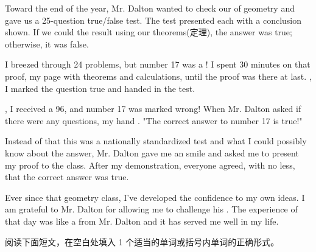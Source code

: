 \documentclass{英语试卷}
\begin{document}
\par Toward the end of the year, Mr. Dalton wanted to check our  of geometry and gave us a 25-question true/false test. The test presented each  with a conclusion shown. If we could  the result using our theorems(定理), the answer was true; otherwise, it was false.\par
\par I breezed through 24 problems, but number 17 was a ! I spent 30 minutes on that proof,  my page with theorems and calculations, until the proof was there at last. , I marked the question true and handed in the test.\par
\par {}, I received a 96, and number 17 was marked wrong! When Mr. Dalton asked if there were any questions, my hand . "The correct answer to number 17 is true!"\par
\par Instead of  that this was a nationally standardized test and what I could possibly know about the answer, Mr. Dalton gave me an  smile and asked me to present my proof to the class. After my demonstration, everyone agreed, with  no less, that the correct answer was true.\par
\par Ever since that geometry class, I've developed the confidence to  my own ideas. I am grateful to Mr. Dalton for allowing me to challenge his . The experience of that day was like a  from Mr. Dalton and it has served me well in my life.\par
{}
\par 阅读下面短文，在空白处填入 1 个适当的单词或括号内单词的正确形式。\par
\end{document}
